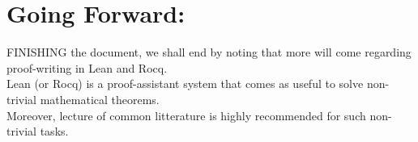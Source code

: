 \documentclass[10pt]{article}
\theoremstyle{plain}
\theoremstyle{definition}
\theoremstyle{remark}
\begin{document}
\section{Going Forward:}

\lettrine[lines=2, lhang=0.1, loversize=0.2]{F}INISHING the document, we shall end by noting that more will come regarding proof-writing in Lean and Rocq.\\Lean (or Rocq) is a proof-assistant system that comes as useful to solve non-trivial mathematical theorems.\\Moreover, lecture of common litterature is highly recommended for such non-trivial tasks.

\nocite{*}





\end{document}
